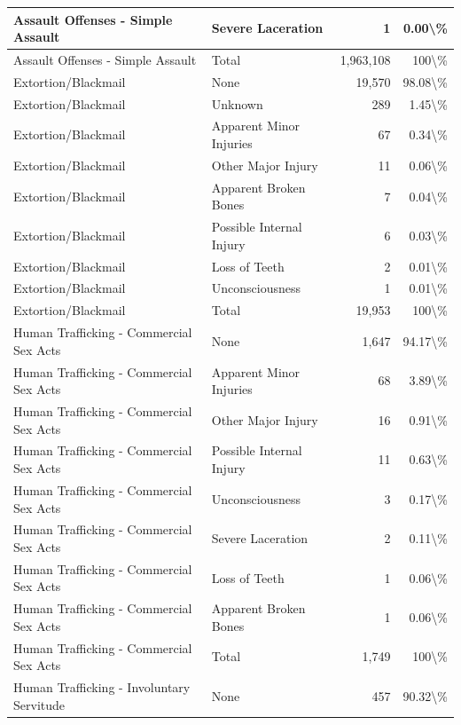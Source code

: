 \documentclass[
]{krantz}
\begin{document}
\begin{longtable}[t]{l|l|r|r}
\hline
Assault Offenses - Simple Assault & Severe Laceration & 1 & 0.00\textbackslash{}\%\\
\hline
Assault Offenses - Simple Assault & Total & 1,963,108 & 100\textbackslash{}\%\\
\hline
Extortion/Blackmail & None & 19,570 & 98.08\textbackslash{}\%\\
\hline
Extortion/Blackmail & Unknown & 289 & 1.45\textbackslash{}\%\\
\hline
Extortion/Blackmail & Apparent Minor Injuries & 67 & 0.34\textbackslash{}\%\\
\hline
Extortion/Blackmail & Other Major Injury & 11 & 0.06\textbackslash{}\%\\
\hline
Extortion/Blackmail & Apparent Broken Bones & 7 & 0.04\textbackslash{}\%\\
\hline
Extortion/Blackmail & Possible Internal Injury & 6 & 0.03\textbackslash{}\%\\
\hline
Extortion/Blackmail & Loss of Teeth & 2 & 0.01\textbackslash{}\%\\
\hline
Extortion/Blackmail & Unconsciousness & 1 & 0.01\textbackslash{}\%\\
\hline
Extortion/Blackmail & Total & 19,953 & 100\textbackslash{}\%\\
\hline
Human Trafficking - Commercial Sex Acts & None & 1,647 & 94.17\textbackslash{}\%\\
\hline
Human Trafficking - Commercial Sex Acts & Apparent Minor Injuries & 68 & 3.89\textbackslash{}\%\\
\hline
Human Trafficking - Commercial Sex Acts & Other Major Injury & 16 & 0.91\textbackslash{}\%\\
\hline
Human Trafficking - Commercial Sex Acts & Possible Internal Injury & 11 & 0.63\textbackslash{}\%\\
\hline
Human Trafficking - Commercial Sex Acts & Unconsciousness & 3 & 0.17\textbackslash{}\%\\
\hline
Human Trafficking - Commercial Sex Acts & Severe Laceration & 2 & 0.11\textbackslash{}\%\\
\hline
Human Trafficking - Commercial Sex Acts & Loss of Teeth & 1 & 0.06\textbackslash{}\%\\
\hline
Human Trafficking - Commercial Sex Acts & Apparent Broken Bones & 1 & 0.06\textbackslash{}\%\\
\hline
Human Trafficking - Commercial Sex Acts & Total & 1,749 & 100\textbackslash{}\%\\
\hline
Human Trafficking - Involuntary Servitude & None & 457 & 90.32\textbackslash{}\%\\

\end{longtable}
\end{document}
